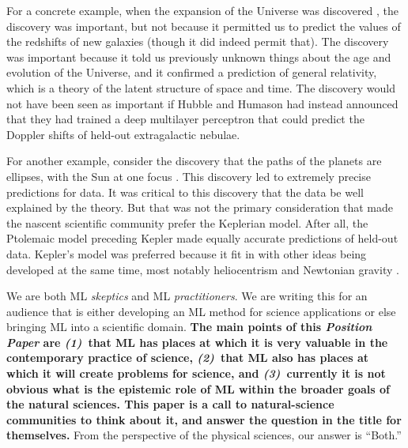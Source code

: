 \documentclass{article}
\newcommand{\documentname}{\textsl{Position Paper}}
\begin{document}
For a concrete example, when the expansion of the Universe was discovered \cite{expansion, expansion2}, the discovery was important, but not because it permitted us to predict the values of the redshifts of new galaxies (though it did indeed permit that).
The discovery was important because it told us previously unknown things about the age and evolution of the Universe, and it confirmed a prediction of general relativity, which is a theory of the latent structure of space and time.
The discovery would not have been seen as important if Hubble and Humason had instead announced that they had trained a deep multilayer perceptron that could predict the Doppler shifts of held-out extragalactic nebulae.

For another example, consider the discovery that the paths of the planets are ellipses, with the Sun at one focus \cite{kepler}.
This discovery led to extremely precise predictions for data.
It was critical to this discovery that the data be well explained by the theory.
But that was not the primary consideration that made the nascent scientific community prefer the Keplerian model.
After all, the Ptolemaic model preceding Kepler made equally accurate predictions of held-out data.
Kepler’s model was preferred because it fit in with other ideas being developed at the same time, most notably heliocentrism \cite{copernicus} and Newtonian gravity \cite{newton}.

We are both ML \emph{skeptics} and ML \emph{practitioners}.
We are writing this for an audience that is either developing an ML method for science applications or else bringing ML into a scientific domain.
\textbf{
The main points of this \documentname{} are \textsl{(1)}~that ML has places at which it is very valuable in the contemporary practice of science, \textsl{(2)}~that ML also has places at which it will create problems for science, and \textsl{(3)}~currently it is not obvious what is the epistemic role of ML within the broader goals of the natural sciences.
This paper is a call to natural-science communities to think about it, and answer the question in the title for themselves.}
From the perspective of the physical sciences, our answer is ``Both.''
\end{document}
